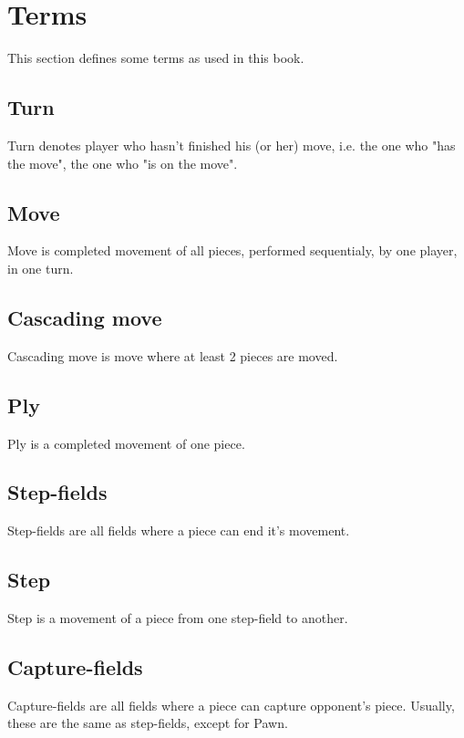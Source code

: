 
\chapter*{Terms}
This section defines some terms as used in this book.

\section*{Turn}
Turn denotes player who hasn't finished his (or her) move, i.e. the one who "has the move",
the one who "is on the move".

\section*{Move}
Move is completed movement of all pieces, performed sequentialy, by one player, in one turn.

\section*{Cascading move}
Cascading move is move where at least 2 pieces are moved.

\section*{Ply}
Ply is a completed movement of one piece.

\section*{Step-fields}
Step-fields are all fields where a piece can end it's movement.

\section*{Step}
Step is a movement of a piece from one step-field to another.

\section*{Capture-fields}
Capture-fields are all fields where a piece can capture opponent's piece.
Usually, these are the same as step-fields, except for Pawn.

